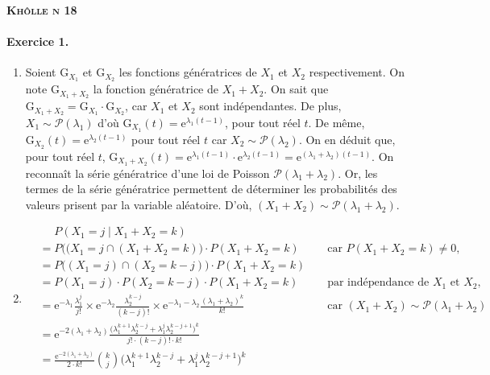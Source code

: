 \documentclass[a4paper]{article}
\def\khollenum{18}
\begin{document}
	\begin{center}
		\bfseries\scshape\Huge Khôlle n \khollenum
	\end{center}

	\paragraph{Exercice 1.}
	\begin{enumerate}
		\item Soient $\mathrm{G}_{X_1}$ et $\mathrm{G}_{X_2}$ les fonctions génératrices de $X_1$ et $X_2$ respectivement.
			On note $\mathrm{G}_{X_1+X_2}$ la fonction génératrice de $X_1 + X_2$.
			On sait que $\mathrm{G}_{X_1+X_2} = \mathrm{G}_{X_1} \cdot \mathrm{G}_{X_2}$, car $X_1$ et $X_2$ sont indépendantes.
			De plus, $X_1 \sim \mathcal{P}(\lambda_1)$ d'où $\mathrm{G}_{X_1}(t) = \mathrm{e}^{\lambda_1(t-1)}$, pour tout réel $t$.
			De même, $\mathrm{G}_{X_2}(t) = \mathrm{e}^{\lambda_2(t-1)}$ pour tout réel $t$ car $X_2 \sim \mathcal{P}(\lambda_2)$.
			On en déduit que, pour tout réel $t$, $\mathrm{G}_{X_1+X_2}(t) = \mathrm{e}^{\lambda_1(t-1)} \cdot \mathrm{e}^{\lambda_2(t-1)} = \mathrm{e}^{(\lambda_1+\lambda_2)(t-1)}$.
			On reconnaît la série génératrice d'une loi de Poisson $\mathcal{P}(\lambda_1 + \lambda_2)$. Or, les termes de la série génératrice permettent de déterminer les probabilités des valeurs prisent par la variable aléatoire.
			D'où, $(X_1+X_2)\sim \mathcal{P}(\lambda_1 + \lambda_2)$.
		\item
			\begin{align*}
				&\mathrel{\phantom=} P(X_1 = j  \mid X_1 + X_2 = k)\\
				&= P\big((X_1 = j \cap (X_1+X_2=k)\big) \cdot P(X_1 + X_2 = k) && \text{ car } P(X_1+X_2 = k) \neq 0,\\
				&= P\big((X_1 = j) \cap (X_2 = k - j)\big) \cdot P(X_1 + X_2 = k) \\
				&= P(X_1 = j) \cdot P(X_2 = k - j) \cdot P(X_1 + X_2 = k) && \text{ par indépendance de $X_1$ et $X_2$}, \\
				&= \mathrm{e}^{-\lambda_1} \frac{\lambda_1^j}{j!} \times \mathrm{e}^{-\lambda_2} \frac{\lambda_2^{k-j}}{(k-j)!} \times \mathrm{e}^{-\lambda_1 - \lambda_2} \frac{(\lambda_1 + \lambda_2)^k}{k!} && \text{ car } (X_1 + X_2) \sim \mathcal{P}(\lambda_1+\lambda_2) \\
				&= \mathrm{e}^{-2(\lambda_1+\lambda_2)} \frac{\big(\lambda_1^{k+1}\lambda_2^{k-j} + \lambda_1^{j} \lambda_2^{k-j+1}\big)^k}{j! \cdot (k-j)! \cdot k!} \\
				&= \frac{\mathrm{e}^{-2(\lambda_1+\lambda_2)}}{2\cdot k!} {k\choose j} \big(\lambda_1^{k+1}\lambda_2^{k-j} + \lambda_1^{j} \lambda_2^{k-j+1}\big)^k \\
			\end{align*}
	\end{enumerate}
\end{document}
